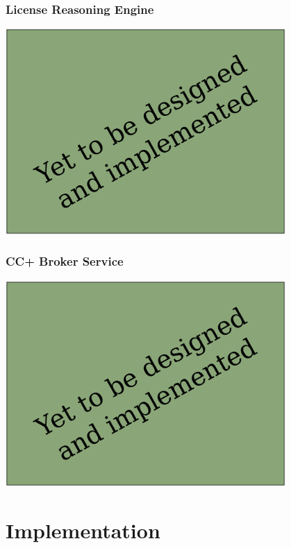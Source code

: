 \documentclass[mathserif,xcolor=dvipsnames,handout]{beamer}
\begin{document}
    \begin{frame}[t]
        \frametitle{License Reasoning Engine}
        \begin{center}
            \includegraphics[width=0.8\textwidth]{todo.pdf}
        \end{center}
    \end{frame}

    \begin{frame}[t]
        \frametitle{CC+ Broker Service}
        \begin{center}
            \includegraphics[width=0.8\textwidth]{todo.pdf}
        \end{center}
    \end{frame}

\section{Implementation}
\end{document}
